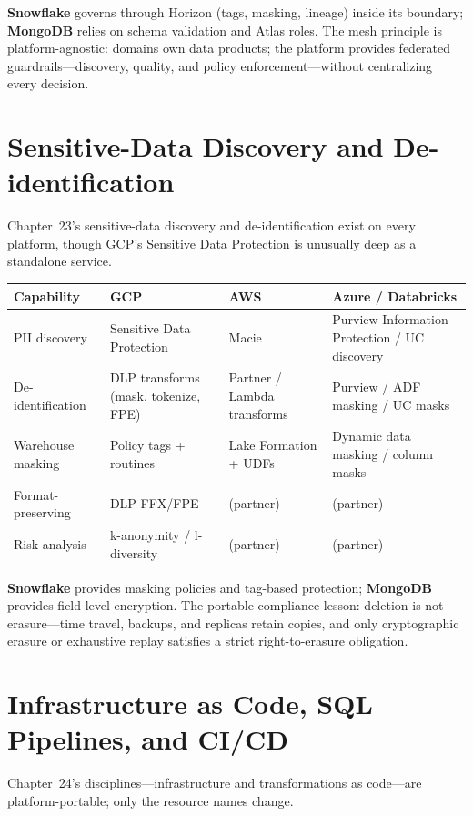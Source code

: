 \noindent \textbf{Snowflake} governs through Horizon (tags, masking, lineage) inside its boundary;
\textbf{MongoDB} relies on schema validation and Atlas roles. The mesh principle is
platform-agnostic: domains own data products; the platform provides federated
guardrails---discovery, quality, and policy enforcement---without centralizing every decision.

\section{Sensitive-Data Discovery and De-identification}
%
Chapter~23's sensitive-data discovery and de-identification exist on every platform, though GCP's
Sensitive Data Protection is unusually deep as a standalone service.

\begin{center}
\footnotesize
\begin{tabular}{@{}p{2.8cm}p{3.0cm}p{3.0cm}p{3.4cm}@{}}
\toprule
\textbf{Capability} & \textbf{GCP} & \textbf{AWS} & \textbf{Azure / Databricks} \\
\midrule
PII discovery & Sensitive Data Protection & Macie & Purview Information Protection / UC discovery \\
De-identification & DLP transforms (mask, tokenize, FPE) & Partner / Lambda transforms & Purview / ADF masking / UC masks \\
Warehouse masking & Policy tags + routines & Lake Formation + UDFs & Dynamic data masking / column masks \\
Format-preserving & DLP FFX/FPE & (partner) & (partner) \\
Risk analysis & k-anonymity / l-diversity & (partner) & (partner) \\
\bottomrule
\end{tabular}
\end{center}

\noindent \textbf{Snowflake} provides masking policies and tag-based protection; \textbf{MongoDB}
provides field-level encryption. The portable compliance lesson: deletion is not
erasure---time travel, backups, and replicas retain copies, and only cryptographic erasure or
exhaustive replay satisfies a strict right-to-erasure obligation.

\section{Infrastructure as Code, SQL Pipelines, and CI/CD}
%
Chapter~24's disciplines---infrastructure and transformations as code---are platform-portable;
only the resource names change.

